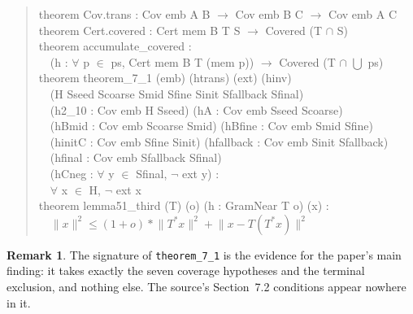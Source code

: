 \documentclass[11pt]{article}
\theoremstyle{definition}
\newtheorem{remark}[theorem]{Remark}
\newcommand{\norm}[1]{\lVert #1\rVert}
\begin{document}
\begin{quote}\ttfamily\small
theorem Cov.trans : Cov emb A B $\to$ Cov emb B C $\to$ Cov emb A C\\[3pt]
theorem Cert.covered : Cert mem B T S $\to$ Covered (T $\cap$ S)\\[3pt]
theorem accumulate\_covered :\\
\ \ (h : $\forall$ p $\in$ ps, Cert mem B T (mem p)) $\to$ Covered (T $\cap$ $\bigcup$ ps)\\[3pt]
theorem theorem\_7\_1 (emb) (htrans) (ext) (hinv)\\
\ \ (H Sseed Scoarse Smid Sfine Sinit Sfallback Sfinal)\\
\ \ (h2\_10 : Cov emb H Sseed) (hA : Cov emb Sseed Scoarse)\\
\ \ (hBmid : Cov emb Scoarse Smid) (hBfine : Cov emb Smid Sfine)\\
\ \ (hinitC : Cov emb Sfine Sinit) (hfallback : Cov emb Sinit Sfallback)\\
\ \ (hfinal : Cov emb Sfallback Sfinal)\\
\ \ (hCneg : $\forall$ y $\in$ Sfinal, $\neg$ ext y) :\\
\ \ $\forall$ x $\in$ H, $\neg$ ext x\\[3pt]
theorem lemma51\_third (T) (o) (h : GramNear T o) (x) :\\
\ \ $\norm{x}^2 \le (1+o) * \norm{T^* x}^2 + \norm{x - T(T^* x)}^2$
\end{quote}

\begin{remark}
The signature of \texttt{theorem\_7\_1} is the evidence for the paper's main finding: it takes
exactly the seven coverage hypotheses and the terminal exclusion, and nothing else. The source's
Section~7.2 conditions appear nowhere in it.
\end{remark}
\end{document}
